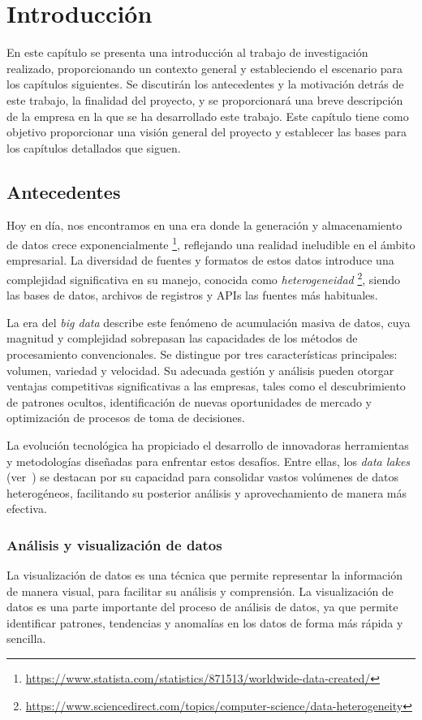 \chapter{Introducción}\label{chap:intro}
En este capítulo se presenta una introducción al trabajo de investigación realizado, proporcionando
un contexto general y estableciendo el escenario para los capítulos siguientes. Se discutirán los
antecedentes y la motivación detrás de este trabajo, la finalidad del proyecto, y se proporcionará
una breve descripción de la empresa en la que se ha desarrollado este trabajo. Este capítulo tiene
como objetivo proporcionar una visión general del proyecto y establecer las bases para los capítulos
detallados que siguen.

\section{Antecedentes}\label{sec:antecedentes}
Hoy en día, nos encontramos en una era donde la generación y almacenamiento de datos crece
exponencialmente \footnote{\url{https://www.statista.com/statistics/871513/worldwide-data-created/}},
reflejando una realidad ineludible en el ámbito empresarial. La diversidad de fuentes y formatos de
estos datos introduce una complejidad significativa en su manejo, conocida como \textit{heterogeneidad}
\footnote{\url{https://www.sciencedirect.com/topics/computer-science/data-heterogeneity}}, siendo las
bases de datos, archivos de registros y APIs las fuentes más habituales.

La era del \textit{big data} describe este fenómeno de acumulación masiva de datos, cuya magnitud y
complejidad sobrepasan las capacidades de los métodos de procesamiento convencionales. Se distingue
por tres características principales: volumen, variedad y velocidad. Su adecuada gestión y análisis
pueden otorgar ventajas competitivas significativas a las empresas, tales como el descubrimiento de
patrones ocultos, identificación de nuevas oportunidades de mercado y optimización de procesos de toma
de decisiones.

La evolución tecnológica ha propiciado el desarrollo de innovadoras herramientas y metodologías
diseñadas para enfrentar estos desafíos. Entre ellas, los \textit{data lakes} (ver~)
se destacan por su capacidad para consolidar vastos volúmenes de datos heterogéneos, facilitando su
posterior análisis y aprovechamiento de manera más efectiva.

\newpage{}
\subsection{Análisis y visualización de datos}\label{subsec:datos}
La visualización de datos es una técnica que permite representar la información de manera visual,
para facilitar su análisis y comprensión. La visualización de datos es una parte importante del
proceso de análisis de datos, ya que permite identificar patrones, tendencias y anomalías en los
datos de forma más rápida y sencilla.

